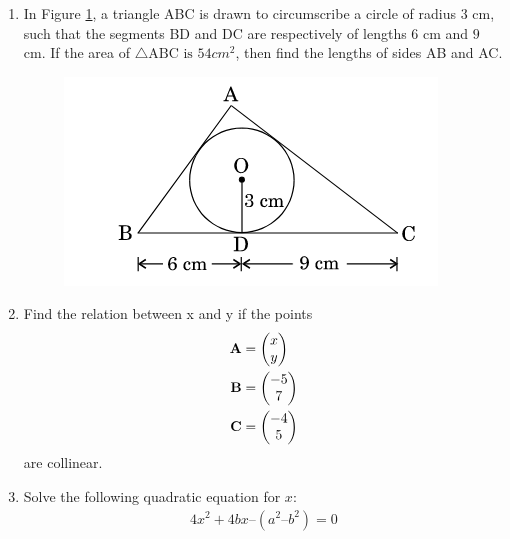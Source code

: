 \documentclass[journal,12pt,twocolumn]{IEEEtran}
\renewcommand\thesection{\arabic{section}}
\begin{document}
\begin{enumerate}[label=\thesection.\arabic*.,ref=\thesection.\theenumi]
\item In Figure \ref{Figure 4}, a triangle ABC is drawn to circumscribe a circle of radius $3$ cm, such that the segments BD and DC are respectively of lengths $6$ cm  and $9$ cm. If the area of $\triangle \text{ABC is }54 cm^2$, then find the lengths of sides AB and AC.
\begin{figure}[h!]
	\centering
    \includegraphics[width=0.8\columnwidth,center]{./figs/image4.png}
	\caption{}
	\label{Figure 4}
\end{figure}
\item Find the relation between x and y if the points 
\begin{align}
\mathbf{A}&=\begin{pmatrix}x \\ y\end{pmatrix}\\ 
\mathbf{B}&=\begin{pmatrix}-5\\7\end{pmatrix}\\
\mathbf{C}&=\begin{pmatrix}-4\\5\end{pmatrix} 
\end{align}
are collinear.
\item Solve the following quadratic equation for $x$:
 \begin{align}
     4x^2 + 4bx – (a^2–b^2) = 0 
 \end{align}
\end{enumerate}
\end{document}
